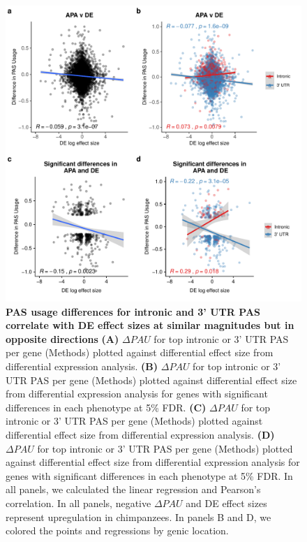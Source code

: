 \begin{figure}
\centering
\includegraphics[width=5in]{img/ch03/fig3.pdf}
\caption[PAS usage differences for intronic and 3' UTR PAS correlate with DE effect sizes at similar magnitudes but in opposite directions]{\textbf{PAS usage differences for intronic and 3' UTR PAS correlate with DE effect sizes at similar magnitudes but in opposite directions} \small {\bf (A)} $\Delta PAU$ for top intronic or 3' UTR PAS per gene (Methods) plotted against differential effect size from differential expression analysis. {\bf (B)}  $\Delta PAU$ for top intronic or 3' UTR PAS per gene (Methods) plotted against differential effect size from differential expression analysis for genes with significant differences in each phenotype at 5\% FDR. {\bf (C)} $\Delta PAU$ for top intronic or 3' UTR PAS per gene (Methods) plotted against differential effect size from differential expression analysis. {\bf(D)} $\Delta PAU$ for top intronic or 3' UTR PAS per gene (Methods) plotted against differential effect size from differential expression analysis for genes with significant differences in each phenotype at 5\% FDR. In all panels, we calculated the linear regression and Pearson's correlation. In all panels, negative $\Delta PAU$ and DE effect sizes represent upregulation in chimpanzees. In panels B and D, we colored the points and regressions by genic location.} 
\label{fig:Ch3fig3}
\end{figure}

